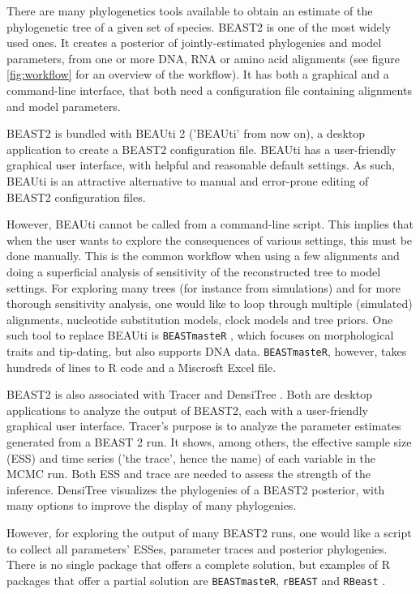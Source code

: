 \documentclass{article}
\begin{document}
There are many phylogenetics tools available to obtain an estimate 
of the phylogenetic tree of a given set of species. 
BEAST2 \cite{bouckaert2014beast} is one of the most widely used ones. 
It creates a posterior of jointly-estimated phylogenies and model parameters, 
from one or more DNA, RNA or amino acid alignments (see figure \ref{fig:workflow} 
for an overview of the workflow). 
It has both a graphical and a command-line interface, 
that both need a configuration file containing 
alignments and model parameters.

BEAST2 is bundled with BEAUti 2 \cite{drummond2012bayesian} ('BEAUti' from now on), 
a desktop application to create a BEAST2 configuration file.
BEAUti has a user-friendly graphical user interface, with helpful and 
reasonable default settings.
As such, BEAUti is an attractive alternative 
to manual and error-prone editing of BEAST2 configuration files. 

However, BEAUti cannot be called from a command-line script.
This implies that when the user 
wants to explore the consequences of various settings, this must be done manually.
This is the common workflow when using a few alignments and doing a superficial 
analysis of sensitivity of the reconstructed tree to model settings. 
For exploring many trees (for instance from simulations) and for
more thorough sensitivity analysis, one would like to loop through 
multiple (simulated) alignments, nucleotide substitution models, 
clock models and tree priors. 
One such tool to replace BEAUti is \verb;BEASTmasteR; \cite{beastmaster},
which focuses on morphological traits and tip-dating, but also 
supports DNA data. \verb;BEASTmasteR;, however, takes hundreds of
lines to R code and a Miscrosft Excel file.

BEAST2 is also associated with Tracer \cite{tracer} and 
DensiTree \cite{DensiTree}. Both are desktop applications 
to analyze the output of BEAST2, each with a user-friendly graphical user interface. 
Tracer's purpose is to analyze the parameter estimates generated
from a BEAST 2 run. It shows, among
others, the effective sample size (ESS) and time series ('the trace', 
hence the name) of each variable in the MCMC run. Both ESS and trace
are needed to assess the strength of the inference. 
DensiTree visualizes the phylogenies of a BEAST2 posterior, with
many options to improve the display of many phylogenies.

However, for exploring the output of many BEAST2 runs, 
one would like a script to collect all parameters' ESSes,
parameter traces and posterior phylogenies.
There is no single package that offers a complete solution,
but examples of R packages that offer a partial solution
are \verb;BEASTmasteR;, \verb;rBEAST; 
\cite{rBEAST_ratmann} and 
\verb;RBeast; \cite{RBeast_faria}. 
\end{document}
